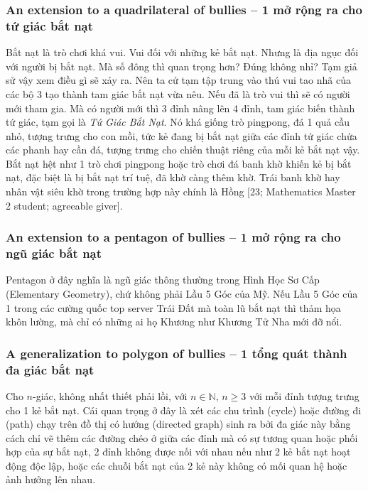 \documentclass[12pt,twoside]{book}
\begin{document}
\subsubsection{An extension to a quadrilateral of bullies -- 1 mở rộng ra cho tứ giác bắt nạt}
Bắt nạt là trò chơi khá vui. Vui đối với những kẻ bắt nạt. Nhưng là địa ngục đối với người bị bắt nạt. Mà số đông thì quan trọng hơn? Đúng không nhỉ? Tạm giả sử vậy xem điều gì sẽ xảy ra. Nên ta cứ tạm tập trung vào thú vui tao nhã của các bộ 3 tạo thành tam giác bắt nạt vừa nêu. Nếu đã là trò vui thì sẽ có người mới tham gia. Mà có người mới thì 3 đỉnh nâng lên 4 đỉnh, tam giác biến thành tứ giác, tạm gọi là {\it Tứ Giác Bắt Nạt}. Nó khá giống trò pingpong, đá 1 quả cầu nhỏ, tượng trưng cho con mồi, tức kẻ đang bị bắt nạt giữa các đỉnh tứ giác chứa các phanh hay cần đá, tượng trưng cho chiến thuật riêng của mỗi kẻ bắt nạt vậy. Bắt nạt hệt như 1 trò chơi pingpong hoặc trò chơi đá banh khờ khiến kẻ bị bắt nạt, đặc biệt là bị bắt nạt trí tuệ, đã khờ càng thêm khờ. Trái banh khờ hay nhân vật siêu khờ trong trường hợp này chính là {\sf Hồng [23; Mathematics Master 2 student; agreeable giver]}.

\subsubsection{An extension to a pentagon of bullies -- 1 mở rộng ra cho ngũ giác bắt nạt}
Pentagon ở đây nghĩa là ngũ giác thông thường trong Hình Học Sơ Cấp (Elementary Geometry), chứ không phải Lầu 5 Góc của Mỹ. Nếu Lầu 5 Góc của 1 trong các cường quốc top server Trái Đất mà toàn lũ bắt nạt thì thảm họa khôn lường, mà chỉ có những ai họ Khương như {\sc Khương Tử Nha} mới đỡ nổi.

\subsubsection{A generalization to polygon of bullies -- 1 tổng quát thành đa giác bắt nạt}
Cho $n$-giác, không nhất thiết phải lồi, với $n\in\mathbb{N}$, $n\ge3$ với mỗi đỉnh tượng trưng cho 1 kẻ bắt nạt. Cái quan trọng ở đây là xét các chu trình (cycle) hoặc đường đi (path) chạy trên đồ thị có hướng (directed graph) sinh ra bởi đa giác này bằng cách chỉ vẽ thêm các đường chéo ở giữa các đỉnh mà có sự tương quan hoặc phối hợp của sự bắt nạt, 2 đỉnh không được nối với nhau nếu như 2 kẻ bắt nạt hoạt động độc lập, hoặc các chuỗi bắt nạt của 2 kẻ này không có mối quan hệ hoặc ảnh hưởng lên nhau.
\end{document}
